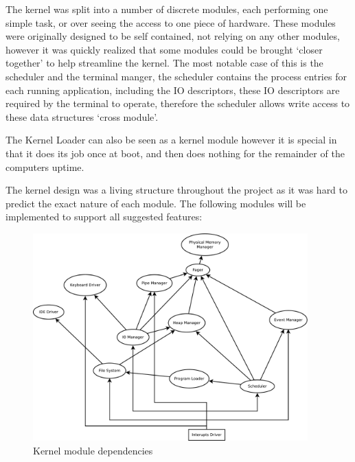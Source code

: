 \documentclass[a4paper]{report}
\begin{document}
The kernel was split into a number of discrete modules, each performing one simple task, or over seeing the access to one piece of hardware. These modules were originally designed to be self contained, not relying on any other modules, however it was quickly realized that some modules could be brought `closer together' to help streamline the kernel. The most notable case of this is the scheduler and the terminal manger, the scheduler contains the process entries for each running application, including the IO descriptors, these IO descriptors are required by the terminal to operate, therefore the scheduler allows write access to these data structures `cross module'.

The Kernel Loader can also be seen as a kernel module however it is special in that it does its job once at boot, and then does nothing for the remainder of the computers uptime.


The kernel design was a living structure throughout the project as it was hard to predict the exact nature of each module. The following modules will be implemented to support all suggested features:

\begin{figure}[ht]
\centering
\includegraphics[width=400px]{images/Kernel_Moduels}
\caption{Kernel module dependencies}
\label{fig:WinTitleBarScreen}
\end{figure}

\end{document}
